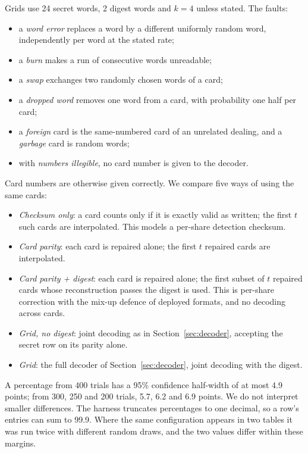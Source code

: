 \documentclass[numeric]{anvil-paper}
\begin{document}
Grids use 24 secret words, 2 digest words and $k=4$ unless stated. The faults:
\begin{itemize}
\item a \emph{word error} replaces a word by a different uniformly random
  word, independently per word at the stated rate;
\item a \emph{burn} makes a run of consecutive words unreadable;
\item a \emph{swap} exchanges two randomly chosen words of a card;
\item a \emph{dropped word} removes one word from a card, with probability
  one half per card;
\item a \emph{foreign} card is the same-numbered card of an unrelated dealing,
  and a \emph{garbage} card is random words;
\item with \emph{numbers illegible}, no card number is given to the decoder.
\end{itemize}
Card numbers are otherwise given correctly. We compare five ways of using the
same cards:
\begin{itemize}
\item \emph{Checksum only}: a card counts only if it is exactly valid as
  written; the first $t$ such cards are interpolated. This models a per-share
  detection checksum.
\item \emph{Card parity}: each card is repaired alone; the first $t$ repaired
  cards are interpolated.
\item \emph{Card parity + digest}: each card is repaired alone; the first
  subset of $t$ repaired cards whose reconstruction passes the digest is
  used. This is per-share correction with the mix-up defence of deployed
  formats, and no decoding across cards.
\item \emph{Grid, no digest}: joint decoding as in
  Section~\ref{sec:decoder}, accepting the secret row on its parity alone.
\item \emph{Grid}: the full decoder of Section~\ref{sec:decoder}, joint
  decoding with the digest.
\end{itemize}
A percentage from 400 trials has a 95\% confidence half-width of at most 4.9
points; from 300, 250 and 200 trials, 5.7, 6.2 and 6.9 points. We do not
interpret smaller differences. The harness truncates percentages to one
decimal, so a row's entries can sum to 99.9. Where the same configuration appears in two
tables it was run twice with different random draws, and the two values differ
within these margins.
\end{document}
